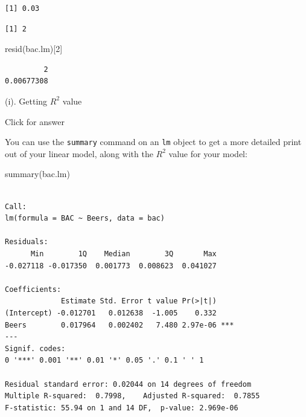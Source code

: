 \documentclass[
]{book}
\newenvironment{Shaded}{\begin{snugshade}}{\end{snugshade}}
\newcommand{\DecValTok}[1]{\textcolor[rgb]{0.00,0.00,0.81}{#1}}
\newcommand{\FunctionTok}[1]{\textcolor[rgb]{0.00,0.00,0.00}{#1}}
\newcommand{\NormalTok}[1]{#1}
\newcommand{\SpecialCharTok}[1]{\textcolor[rgb]{0.00,0.00,0.00}{#1}}
\begin{document}
\begin{verbatim}
[1] 0.03
\end{verbatim}

\begin{Shaded}
\end{Shaded}

\begin{verbatim}
[1] 2
\end{verbatim}

\begin{Shaded}
\begin{Highlighting}[]
\FunctionTok{resid}\NormalTok{(bac.lm)[}\DecValTok{2}\NormalTok{]}
\end{Highlighting}
\end{Shaded}

\begin{verbatim}
         2 
0.00677308 
\end{verbatim}

(i). Getting \(R^2\) value

Click for answer

You can use the \texttt{summary} command on an \texttt{lm} object to get a more detailed print out of your linear model, along with the \(R^2\) value for your model:

\begin{Shaded}
\begin{Highlighting}[]
\FunctionTok{summary}\NormalTok{(bac.lm)}
\end{Highlighting}
\end{Shaded}

\begin{verbatim}

Call:
lm(formula = BAC ~ Beers, data = bac)

Residuals:
      Min        1Q    Median        3Q       Max 
-0.027118 -0.017350  0.001773  0.008623  0.041027 

Coefficients:
             Estimate Std. Error t value Pr(>|t|)    
(Intercept) -0.012701   0.012638  -1.005    0.332    
Beers        0.017964   0.002402   7.480 2.97e-06 ***
---
Signif. codes:  
0 '***' 0.001 '**' 0.01 '*' 0.05 '.' 0.1 ' ' 1

Residual standard error: 0.02044 on 14 degrees of freedom
Multiple R-squared:  0.7998,    Adjusted R-squared:  0.7855 
F-statistic: 55.94 on 1 and 14 DF,  p-value: 2.969e-06
\end{verbatim}
\end{document}
